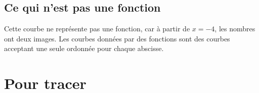 %




\subsection{Ce qui n'est pas une fonction}


\begin{multicols}{2}
    Cette courbe ne représente pas une fonction, car à partir de \( x=-4\), les nombres ont deux images. Les courbes données par des fonctions sont des courbes acceptant une seule ordonnée pour chaque abscisse.

\columnbreak




\end{multicols}

\section{Pour tracer}

